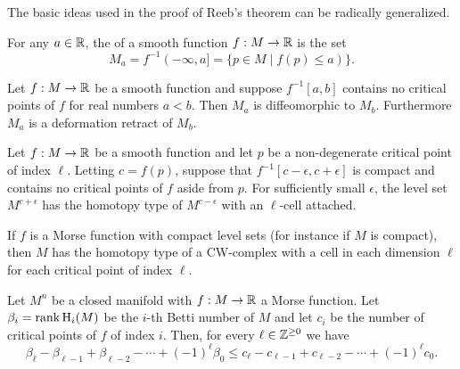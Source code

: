 The basic ideas used in the proof of Reeb's theorem can be radically generalized.

\begin{definition}
	For any $a\in \mathbb{R}$, the  of a smooth function $f : M \to \mathbb{R}$ is the set 
	\[
		M_a = f^{-1}(-\infty, a] = \{ p\in M \mid f(p)\leq a)\}.
	\]
\end{definition}

\begin{figure}
\end{figure}

\begin{theorem}
	Let $f : M \to \mathbb{R}$ be a smooth function and suppose $f^{-1}[a,b]$ contains no critical points of $f$ for real numbers $a<b$. Then $M_a$ is diffeomorphic to $M_b$. Furthermore $M_a$ is a deformation retract of $M_b$.
\end{theorem}

\begin{theorem}
	Let $f : M \to \mathbb{R}$ be a smooth function and let $p$ be a non-degenerate critical point of index $\ell$. Letting $c=f(p)$, suppose that $f^{-1}[c-\epsilon, c+\epsilon]$ is compact and contains no critical points of $f$ aside from $p$. For sufficiently small $\epsilon$, the level set $M^{c+\epsilon}$ has the homotopy type of $M^{c-\epsilon}$ with an $\ell$-cell attached.
\end{theorem}

\begin{theorem}
	If $f$ is a Morse function with compact level sets (for instance if $M$ is compact), then $M$ has the homotopy type of a CW-complex with a cell in each dimension $\ell$ for each critical point of index $\ell$.
\end{theorem}


\begin{theorem}
	Let $M^n$ be a closed manifold with $f : M\to \mathbb{R}$ a Morse function. Let $\beta_i=\operatorname{rank} \operatorname{H}_i(M)$ be the $i$-th Betti number of $M$ and let $c_i$ be the number of critical points of $f$ of index $i$. Then, for every $\ell\in \mathbb{Z}^{\geq 0}$ we have
	\[
		\beta_\ell - \beta_{\ell-1} + \beta_{\ell-2} - \cdots +(-1)^\ell \beta_0 \leq c_\ell - c_{\ell-1} + c_{\ell-2} - \cdots + (-1)^\ell c_0.
	\]
\end{theorem}
